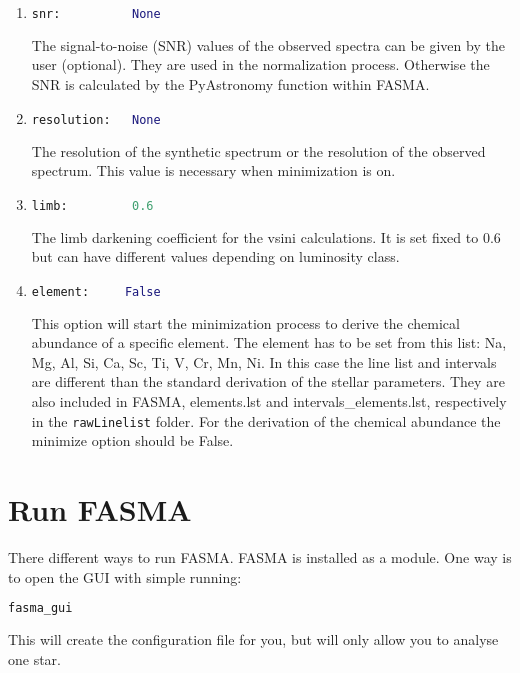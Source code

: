 \documentclass[a4paper,12pt]{article}
\begin{document}
\begin{enumerate}
\item
\begin{lstlisting}[language=Python]
snr:          None
\end{lstlisting}
The signal-to-noise (SNR) values of the observed spectra can be given by the user (optional). They are used in the normalization process. Otherwise the SNR is calculated by the PyAstronomy function 
within FASMA.

\item
\begin{lstlisting}[language=Python]
resolution:   None
\end{lstlisting}
The resolution of the synthetic spectrum or the resolution of the observed spectrum. This value is necessary when minimization is on.

\item
\begin{lstlisting}[language=Python]
limb:         0.6
\end{lstlisting}
The limb darkening coefficient for the vsini calculations. It is set fixed to 0.6 but can have different values depending on luminosity class.

\item
\begin{lstlisting}[language=Python]
element:     False
\end{lstlisting}
This option will start the minimization process to derive the chemical abundance of a specific element. The element has to be set from this list: 
Na, Mg, Al, Si, Ca, Sc, Ti, V, Cr, Mn, Ni. In this case the line list and intervals are different than the standard derivation of the stellar parameters. 
They are also included in FASMA, elements.lst and intervals\_elements.lst, respectively in the \texttt{rawLinelist} folder. For the derivation of the chemical 
abundance the minimize option should be False. 

\end{enumerate}


\section{Run FASMA}

There different ways to run FASMA. FASMA is installed as a module. One way is to open the GUI with simple running:
\begin{lstlisting}[language=Python]
fasma_gui
\end{lstlisting}
This will create the configuration file for you, but will only allow you to analyse one star.
\end{document}
